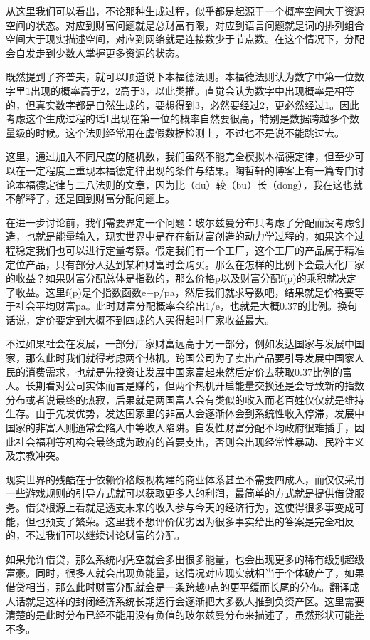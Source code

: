 \documentclass[
]{book}
\begin{document}
从这里我们可以看出，不论那种生成过程，似乎都是起源于一个概率空间大于资源空间的状态。对应到财富问题就是总财富有限，对应到语言问题就是词的排列组合空间大于现实描述空间，对应到网络就是连接数少于节点数。在这个情况下，分配会自发走到少数人掌握更多资源的状态。

既然提到了齐普夫，就可以顺道说下本福德法则。本福德法则认为数字中第一位数字里1出现的概率高于2，2高于3，以此类推。直觉会认为数字中出现概率是相等的，但真实数字都是自然生成的，要想得到3，必然要经过2，更必然经过1。因此考虑这个生成过程的话1出现在第一位的概率自然要很高，特别是数据跨越多个数量级的时候。这个法则经常用在虚假数据检测上，不过也不是说不能跳过去。

这里，通过加入不同尺度的随机数，我们虽然不能完全模拟本福德定律，但至少可以在一定程度上重现本福德定律出现的条件与结果。陶哲轩的博客上有一篇专门讨论本福德定律与二八法则的文章，因为比（du）较（bu）长（dong），我在这也就不解释了，还是回到财富分配问题上。

在进一步讨论前，我们需要界定一个问题：玻尔兹曼分布只考虑了分配而没考虑创造，也就是能量输入，现实世界中是存在新财富创造的动力学过程的，如果这个过程稳定我们也可以进行定量考察。假定我们有一个工厂，这个工厂的产品属于精准定位产品，只有部分人达到某种财富时会购买。那么在怎样的比例下会最大化厂家的收益？如果财富分配总体是指数的，那么价格p以及财富分配f(p)的乘积就决定了收益。这里f(p)是个指数函数e−p/pa，然后我们就求导数吧，结果就是价格要等于社会平均财富pa。此时财富分配概率会给出1/e，也就是大概0.37的比例。换句话说，定价要定到大概不到四成的人买得起时厂家收益最大。

不过如果社会在发展，一部分厂家财富远高于另一部分，例如发达国家与发展中国家，那么此时我们就得考虑两个热机。跨国公司为了卖出产品要引导发展中国家人民的消费需求，也就是先投资让发展中国家富起来然后定价去获取0.37比例的富人。长期看对公司实体而言是赚的，但两个热机开启能量交换还是会导致新的指数分布或者说最终的热寂，后果就是两国富人会有类似的收入而老百姓仅仅就是维持生存。由于先发优势，发达国家里的非富人会逐渐体会到系统性收入停滞，发展中国家的非富人则通常会陷入中等收入陷阱。自发性财富分配不均政府很难插手，因此社会福利等机构会最终成为政府的首要支出，否则会出现经常性暴动、民粹主义及宗教冲突。

现实世界的残酷在于依赖价格歧视构建的商业体系甚至不需要四成人，而仅仅采用一些游戏规则的引导方式就可以获取更多人的利润，最简单的方式就是提供借贷服务。借贷根源上看就是透支未来的收入参与今天的经济行为，这使得很多事变成可能，但也预支了繁荣。这里我不想评价优劣因为很多事实给出的答案是完全相反的，不过我们可以继续讨论财富的分配。

如果允许借贷，那么系统内凭空就会多出很多能量，也会出现更多的稀有级别超级富豪。同时，很多人就会出现负能量，这情况对应现实就相当于个体破产了，如果借贷相当，那么此时财富分配就会是一条跨越0点的更平缓而长尾的分布。翻译成人话就是这样的封闭经济系统长期运行会逐渐把大多数人推到负资产区。这里需要清楚的是此时分布已经不能用没有负值的玻尔兹曼分布来描述了，虽然形状可能差不多。
\end{document}
